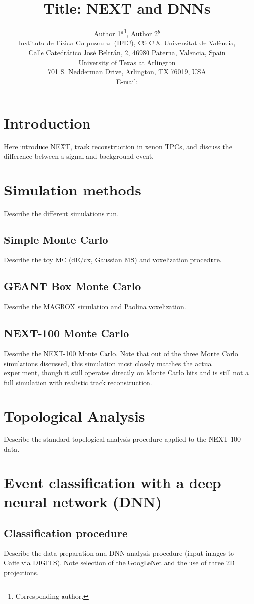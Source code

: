 \documentclass{JINST}
\title{Title: NEXT and DNNs}
\author{Author 1$^a$\thanks{Corresponding author.},
Author 2$^b$\\
\llap{$^a$}Instituto de F\'isica Corpuscular (IFIC), CSIC \& Universitat de Val\`encia,\\ 
Calle Catedr\'atico Jos\'e Beltr\'an, 2, 46980 Paterna, Valencia, Spain\\
\llap{$^b$}University of Texas at Arlington\\
 701 S. Nedderman Drive, Arlington, TX 76019, USA\\
E-mail: \email{correspodingauthor@ific.uv.es}}
\begin{document}
\section{Introduction}\label{sec:intro}
\noindent Here introduce NEXT, track reconstruction in xenon TPCs, and discuss the difference between a signal and background event.

\section{Simulation methods}
Describe the different simulations run.

\subsection{Simple Monte Carlo}
Describe the toy MC (dE/dx, Gaussian MS) and voxelization procedure.

\subsection{GEANT Box Monte Carlo}
Describe the MAGBOX simulation and Paolina voxelization.

\subsection{NEXT-100 Monte Carlo}
Describe the NEXT-100 Monte Carlo.  Note that out of the three Monte Carlo simulations discussed, this simulation most closely matches the actual experiment, though it still operates
directly on Monte Carlo hits and is still not a full simulation with realistic track reconstruction.

\section{Topological Analysis}
Describe the standard topological analysis procedure applied to the NEXT-100 data.

\section{Event classification with a deep neural network (DNN)}
\subsection{Classification procedure}
Describe the data preparation and DNN analysis procedure (input images to Caffe via DIGITS).  Note selection of the GoogLeNet and the use of three 2D projections.
\end{document}
